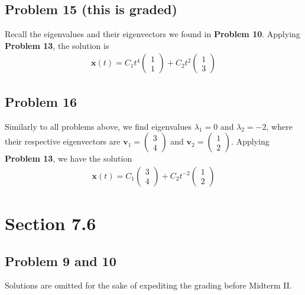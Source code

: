\documentclass[12pt]{article}
\begin{document}
\subsection*{Problem 15 (this is graded)}
\label{sec:org7e829c9}
Recall the eigenvalues and their eigenvectors we found in \textbf{Problem
10}. Applying \textbf{Problem 13}, the solution is
\begin{align*}
        \mathbf{x}(t) = C_1 t^4 \begin{pmatrix} 1\\ 1\end{pmatrix}
        + C_2 t^2 \begin{pmatrix} 1\\ 3\end{pmatrix}
\end{align*}
\subsection*{Problem 16}
\label{sec:org10a5871}
Similarly to all problems above, we find eigenvalues
\(\lambda_1 = 0\) and \(\lambda_2 = -2\), where their respective eigenvectors are
\(\mathbf{v}_1 = \begin{pmatrix} 3 \\ 4\end{pmatrix}\) and
\(\mathbf{v}_2 = \begin{pmatrix} 1 \\ 2\end{pmatrix}\). Applying \textbf{Problem 13}, we
have the solution
\begin{align*}
        \mathbf{x}(t) = C_1 \begin{pmatrix} 3\\ 4\end{pmatrix} +
        C_2 t^{-2} \begin{pmatrix} 1\\ 2\end{pmatrix}
\end{align*}
\section*{Section 7.6}
\label{sec:orgd5832c5}
\subsection*{Problem 9 and 10}
\label{sec:org14282a3}
Solutions are omitted for the sake of expediting the grading before Midterm
II. 
\end{document}
